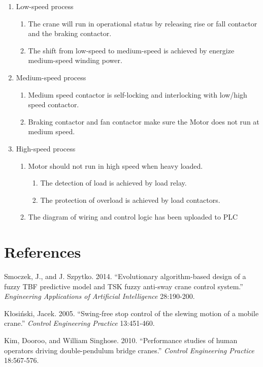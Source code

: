 \documentclass[a4paper,10.5pt]{article}
\begin{document}
\begin{enumerate}
\begin{enumerate}
\item Low-speed process
		\begin{enumerate}
\item The crane will run in operational status by releasing rise or fall  contactor and the braking contactor.
\item The shift from low-speed to medium-speed is achieved by energize medium-speed winding power.
		\end{enumerate}
\item Medium-speed process
	\begin{enumerate}
\item Medium speed contactor is self-locking and  interlocking with  low/high speed contactor.
\item Braking contactor and fan contactor make sure the Motor does not run at medium speed.
	\end{enumerate}
\item High-speed process
	\begin{enumerate}
\item Motor should not run in high speed when heavy loaded.
	\begin{enumerate}
\item The detection of load is achieved  by load relay.
\item The protection of overload is achieved by load contactors.
	\end{enumerate}
\item The diagram of wiring and control logic has been uploaded to PLC 
	\end{enumerate} 
	\end{enumerate}
	\end{enumerate}
	
\section*{References}
\setlength{\hangindent}{4em}
Smoczek, J., and J. Szpytko. 2014. “Evolutionary algorithm-based design of a fuzzy TBF predictive model and TSK fuzzy anti-sway crane control system.” \textit{Engineering Applications of Artificial Intelligence} 28:190-200. \par

\setlength{\hangindent}{4em}
Kłosiński, Jacek. 2005. “Swing-free stop control of the slewing motion of a mobile crane.”
\textit{Control Engineering Practice} 13:451-460. \par

\setlength{\hangindent}{4em}
Kim, Dooroo, and William Singhose. 2010. “Performance studies of human operators driving double-pendulum bridge cranes.” 
\textit{Control Engineering Practice} 18:567-576. \par
\end{document}
